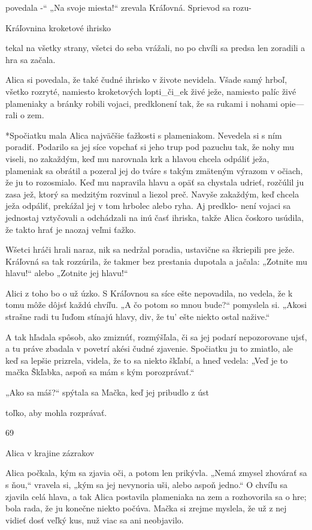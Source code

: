 \documentclass[12pt]{article}
\begin{document}
\begin{Parallel}[p]{}{}
{{povedala -“
„Na svoje miesta!“ zrevala Kráľovná. Sprievod sa rozu-

 

Kráľovnina kroketové ihrisko

tekal na všetky strany, všetci do seba vrážali, no po chvíli
sa predsa len zoradili a hra sa začala.

Alica si povedala, že také čudné ihrisko v živote nevidela.
Všade samý hrboľ, všetko rozryté, namiesto kroketových
lopti_či_ek živé ježe, namiesto palíc živé plameniaky a bránky
robili vojaci, predklonení tak, že sa rukami i nohami opie—
rali o zem.

*Spočiatku mala Alica najväčšie ťažkosti s plameniakom.
Nevedela si s ním poradiť. Podarilo sa jej síce vopchať si jeho
trup pod pazuchu tak, že nohy mu viseli, no zakaždým, keď
mu narovnala krk a hlavou chcela odpáliť ježa, plameniak sa
obrátil a pozeral jej do tváre s takým zmäteným výrazom
v očiach, že ju to rozosmialo. Keď mu napravila hlavu a opäť
sa chystala udrieť, rozčúlil ju zasa jež, ktorý sa medzitým
rozvinul a liezol preč. Navyše zakaždým, keď chcela ježa
odpáliť, prekážal jej v tom hrbolec alebo ryha. Aj predklo-
není vojaci sa jednostaj vztyčovali a odchádzali na inú časť
ihriska, takže Alica čoskoro usúdila, že takto hrať je naozaj
veľmi ťažko.

Wšetci hráči hrali naraz, nik sa nedržal poradia, ustavične
sa škriepili pre ježe. Kráľovná sa tak rozzúrila, že takmer bez
prestania dupotala a jačala: „Zotnite mu hlavu!“ alebo
„Zotnite jej hlavu!“

Alici z toho bo o už úzko. S Kráľovnou sa síce ešte
nepovadila, no vedela, že k tomu môže dôjsť každú chvíľu.
„A čo potom so mnou bude?“ pomyslela si. „Akosi strašne
radi tu ľuďom stínajú hlavy, div, že tu' ešte niekto ostal
nažive.“

A tak hľadala spôsob, ako zmiznúť, rozmýšľala, či sa jej
podarí nepozorovane ujsť, a tu práve zbadala v povetrí akési
čudné zjavenie. Spočiatku ju to zmiatlo, ale keď sa lepšie
prizrela, videla, že to sa niekto škľabí, a hneď vedela: „Veď
je to mačka Škľabka, aspoň sa mám s kým porozprávať.“

„Ako sa máš?“ spýtala sa Mačka, keď jej pribudlo z úst

toľko, aby mohla rozprávať.

69

Alica v krajine zázrakov

Alica počkala, kým sa zjavia oči, a potom len prikývla.
„Nemá zmysel zhovárať sa s ňou,“ vravela si, „kým sa jej
nevynoria uši, alebo aspoň jedno.“ O chvíľu sa zjavila celá
hlava, a tak Alica postavila plameniaka na zem a rozhovorila
sa o hre; bola rada, že ju konečne niekto počúva. Mačka si
zrejme myslela, že už z nej vidieť dosť veľký kus, nuž viac sa
ani neobjavilo.

}}
\end{Parallel}
\end{document}
